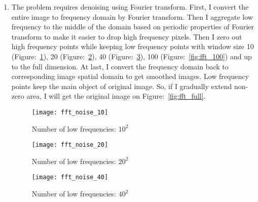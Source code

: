 \documentclass[11pt]{article}
\DeclareMathOperator{\E}{E}
\DeclareMathOperator{\Var}{Var}
\begin{document}
\begin{enumerate}
\item The problem requires denoising using Fourier transform.
First, I convert the entire image to frequency domain by Fourier transform. Then I aggregate low frequency to the middle of the domain based on periodic properties of Fourier transform to make it easier to drop high frequency pixels. Then I zero out high frequency points while keeping low frequency points with window size 10 (Figure:~\ref{fig:fft_10}), 20 (Figure:~\ref{fig:fft_20}), 40 (Figure:~\ref{fig:fft_40}), 100 (Figure:~\ref{fig:fft_100}) and up to the full dimension. At last, I convert the frequency domain back to corresponding image spatial domain to get smoothed images. Low frequency points keep the main object of original image. So, if I gradually extend non-zero area, I will get the original image on Figure:~\ref{fig:fft_full}.
%
%



\begin{figure}[H]
	\begin{center}
		\texttt{[image: fft\_noise\_10]}
		\caption{Number of low frequencies: $10^2$}
		\label{fig:fft_10}
	\end{center}
	
\end{figure}

\begin{figure}[H]
	\begin{center}
		\texttt{[image: fft\_noise\_20]}
		\caption{Number of low frequencies: $20^2$}
		\label{fig:fft_20}
	\end{center}
\end{figure}

\begin{figure}[H]
	\begin{center}
		\texttt{[image: fft\_noise\_40]}
		\caption{Number of low frequencies: $40^2$}
		\label{fig:fft_40}
	\end{center}
\end{figure}


\end{enumerate}
\end{document}
